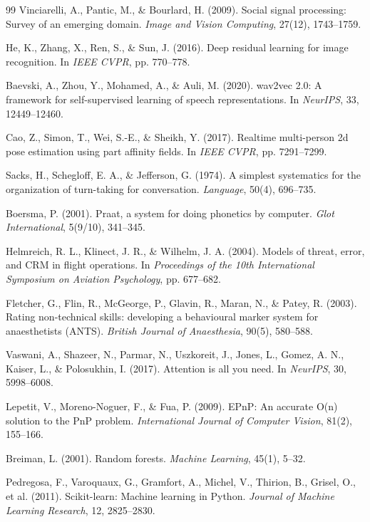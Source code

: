 \documentclass[12pt,a4paper,oneside]{report}
\begin{document}
\begin{thebibliography}{99}
Vinciarelli, A., Pantic, M., \& Bourlard, H. (2009). Social signal processing: Survey of an emerging domain. \textit{Image and Vision Computing}, 27(12), 1743--1759.

He, K., Zhang, X., Ren, S., \& Sun, J. (2016). Deep residual learning for image recognition. In \textit{IEEE CVPR}, pp. 770--778.

Baevski, A., Zhou, Y., Mohamed, A., \& Auli, M. (2020). wav2vec 2.0: A framework for self-supervised learning of speech representations. In \textit{NeurIPS}, 33, 12449--12460.

Cao, Z., Simon, T., Wei, S.-E., \& Sheikh, Y. (2017). Realtime multi-person 2d pose estimation using part affinity fields. In \textit{IEEE CVPR}, pp. 7291--7299.

Sacks, H., Schegloff, E. A., \& Jefferson, G. (1974). A simplest systematics for the organization of turn-taking for conversation. \textit{Language}, 50(4), 696--735.

Boersma, P. (2001). Praat, a system for doing phonetics by computer. \textit{Glot International}, 5(9/10), 341--345.

Helmreich, R. L., Klinect, J. R., \& Wilhelm, J. A. (2004). Models of threat, error, and CRM in flight operations. In \textit{Proceedings of the 10th International Symposium on Aviation Psychology}, pp. 677--682.

Fletcher, G., Flin, R., McGeorge, P., Glavin, R., Maran, N., \& Patey, R. (2003). Rating non-technical skills: developing a behavioural marker system for anaesthetists (ANTS). \textit{British Journal of Anaesthesia}, 90(5), 580--588.

Vaswani, A., Shazeer, N., Parmar, N., Uszkoreit, J., Jones, L., Gomez, A. N., Kaiser, L., \& Polosukhin, I. (2017). Attention is all you need. In \textit{NeurIPS}, 30, 5998--6008.

Lepetit, V., Moreno-Noguer, F., \& Fua, P. (2009). EPnP: An accurate O(n) solution to the PnP problem. \textit{International Journal of Computer Vision}, 81(2), 155--166.

Breiman, L. (2001). Random forests. \textit{Machine Learning}, 45(1), 5--32.

Pedregosa, F., Varoquaux, G., Gramfort, A., Michel, V., Thirion, B., Grisel, O., et al. (2011). Scikit-learn: Machine learning in Python. \textit{Journal of Machine Learning Research}, 12, 2825--2830.


\end{thebibliography}
\end{document}

